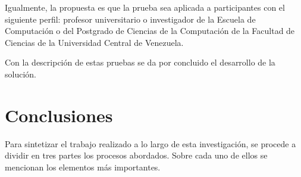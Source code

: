 \documentclass[
  12pt,
  openany]{book}
\begin{document}
Igualmente, la propuesta es que la prueba sea aplicada a participantes con el siguiente perfil: profesor universitario o investigador de la Escuela de Computación o del Postgrado de Ciencias de la Computación de la Facultad de Ciencias de la Universidad Central de Venezuela.

Con la descripción de estas pruebas se da por concluido el desarrollo de la solución.

\hypertarget{conclusiones}{%
\chapter{Conclusiones}\label{conclusiones}}

Para sintetizar el trabajo realizado a lo largo de esta investigación, se procede a dividir en tres partes los procesos abordados. Sobre cada uno de ellos se mencionan los elementos más importantes.
\end{document}
